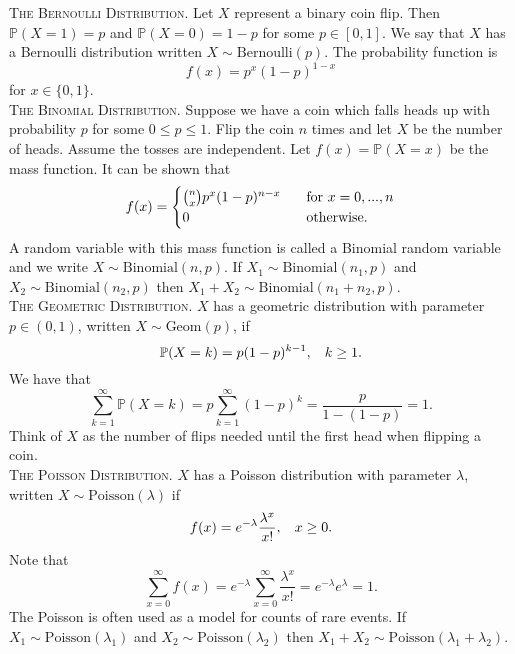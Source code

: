 \documentclass{article}
\theoremstyle{remark}
\newcommand{\1}{\mathbf{1}}
\newcommand{\Prob}{\mathbb{P}}
\begin{document}
\noindent\textsc{The Bernoulli Distribution}. Let $X$ represent a binary coin flip. Then $\Prob(X=1) = p$ and $\Prob(X=0) = 1-p$ for some $p\in[0,1]$. We say that $X$ has a Bernoulli distribution written $X \sim \text{Bernoulli}(p)$. The probability function is 
\[
f(x) = p^x(1-p)^{1-x}
\]
for $x \in \{0,1\}$.\\

\noindent\textsc{The Binomial Distribution}. Suppose we have a coin which falls heads up with probability $p$ for some $0 \leq p \leq 1$. Flip the coin $n$ times and let $X$ be the number of heads. Assume the tosses are independent. Let $f(x) = \Prob(X=x)$ be the mass function. It can be shown that
\[
f(x) = \begin{cases}
\binom{n}{x}p^x(1-p)^{n-x} \hspace{3mm} &\text{for } x = 0,...,n \\
0 \hspace{3mm} &\text{otherwise}.
\end{cases}
\]
A random variable with this mass function is called a Binomial random variable and we write $X \sim \text{Binomial}(n,p)$. If $X_1 \sim \text{Binomial}(n_1, p)$ and $X_2 \sim \text{Binomial}(n_2, p)$ then $X_1 + X_2 \sim \text{Binomial}(n_1+n_2, p)$. \\

\noindent\textsc{The Geometric Distribution}. $X$ has a geometric distribution with parameter $p\in(0,1)$, written $X \sim \text{Geom}(p)$, if 
\[
\Prob(X=k) = p(1-p)^{k-1}, \hspace{3mm} k\geq 1.
\]
We have that 
\[
\sum_{k=1}^{\infty}\Prob(X=k) = p \sum_{k=1}^{\infty}(1-p)^k = \frac{p}{1-(1-p)} = 1.
\]
Think of $X$ as the number of flips needed until the first head when flipping a coin. \\

\noindent\textsc{The Poisson Distribution}. $X$ has a Poisson distribution with parameter $\lambda$, written $X \sim \text{Poisson}(\lambda)$ if 
\[
f(x) = e^{-\lambda} \frac{\lambda^x}{x!}, \hspace{3mm} x\geq0.
\]
Note that 
\[
\sum_{x=0}^{\infty}f(x)=e^{-\lambda} \sum_{x=0}^{\infty} \frac{\lambda^x}{x!} = e^{-\lambda}e^{\lambda} = 1.
\]
The Poisson is often used as a model for counts of rare events. If $X_1 \sim \text{Poisson}(\lambda_1)$ and $X_2 \sim \text{Poisson}(\lambda_2)$ then $X_1 + X_2 \sim \text{Poisson}(\lambda_1+\lambda_2)$.
\end{document}
